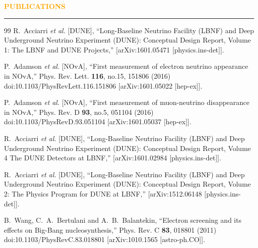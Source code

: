 \documentclass{resume} %
\renewenvironment{rSection}[1]{
\sectionskip
\textcolor{Orange}{\bfseries\MakeUppercase{#1}}
\sectionlineskip
\hrule
\begin{list}{}{
\setlength{\leftmargin}{1.5em}
}
\item[]
}{
\end{list}
}
\begin{document}
\begin{rSection}{ Publications}
\begin{thebibliography}{99}
R.~Acciarri \textit{et al.} [DUNE],
``Long-Baseline Neutrino Facility (LBNF) and Deep Underground Neutrino Experiment (DUNE): Conceptual Design Report, Volume 1: The LBNF and DUNE Projects,''
[arXiv:1601.05471 [physics.ins-det]].

P.~Adamson \textit{et al.} [NOvA],
``First measurement of electron neutrino appearance in NOvA,''
Phys. Rev. Lett. \textbf{116}, no.15, 151806 (2016)
doi:10.1103/PhysRevLett.116.151806
[arXiv:1601.05022 [hep-ex]].

P.~Adamson \textit{et al.} [NOvA],
``First measurement of muon-neutrino disappearance in NOvA,''
Phys. Rev. D \textbf{93}, no.5, 051104 (2016)
doi:10.1103/PhysRevD.93.051104
[arXiv:1601.05037 [hep-ex]].

R.~Acciarri \textit{et al.} [DUNE],
``Long-Baseline Neutrino Facility (LBNF) and Deep Underground Neutrino Experiment (DUNE): Conceptual Design Report, Volume 4 The DUNE Detectors at LBNF,''
[arXiv:1601.02984 [physics.ins-det]].

R.~Acciarri \textit{et al.} [DUNE],
``Long-Baseline Neutrino Facility (LBNF) and Deep Underground Neutrino Experiment (DUNE): Conceptual Design Report, Volume 2: The Physics Program for DUNE at LBNF,''
[arXiv:1512.06148 [physics.ins-det]].

B.~Wang, C.~A.~Bertulani and A.~B.~Balantekin,
``Electron screening and its effects on Big-Bang nucleosynthesis,''
Phys. Rev. C \textbf{83}, 018801 (2011)
doi:10.1103/PhysRevC.83.018801
[arXiv:1010.1565 [astro-ph.CO]].


\end{thebibliography}


\end{rSection}
\end{document}
